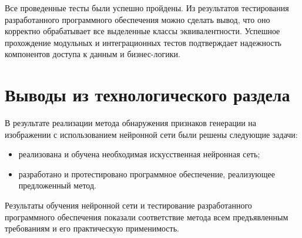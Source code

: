 Все проведенные тесты были успешно пройдены. Из результатов тестирования разработанного программного обеспечения можно сделать вывод, что оно корректно обрабатывает все выделенные классы эквивалентности. Успешное прохождение модульных и интеграционных тестов подтверждает надежность компонентов доступа к данным и бизнес-логики. 

\section{Выводы из технологического раздела}

В результате реализации метода обнаружения признаков генерации на изображении с использованием нейронной сети были решены следующие задачи:
\begin{itemize}
	\item реализована и обучена необходимая искусственная нейронная сеть;
	\item разработано и протестировано программное обеспечение, реализующее предложенный метод.
\end{itemize}

Результаты обучения нейронной сети и тестирование разработанного программного обеспечения показали соответствие метода всем предъявленным требованиям и его практическую применимость.